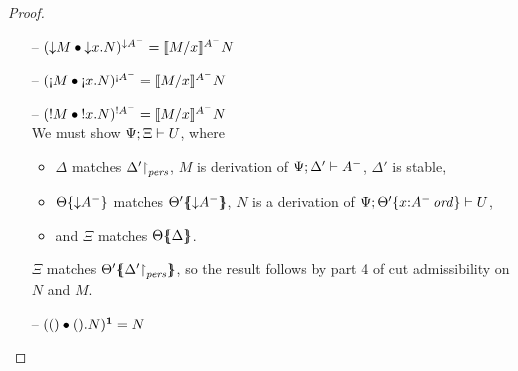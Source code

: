 \begin{proof}
\begin{itemize}
\item[--] $(\subst{\tdownr{M}}{\tdownl{x}{N}})^{{\downarrow}A^-} 
           = \rsubsta{M}{x}{N}{A^-}$ %



\item[--] $(\subst{\tgnabr{M}}{\tgnabl{x}{N}})^{{\scriptgnab}A^-}
           = \rsubsta{M}{x}{N}{A^-}$

\item[--] $(\subst{\tbangr{M}}{\tbangl{x}{N}})^{{!}A^-}
           = \rsubsta{M}{x}{N}{A^-}$ \\
  We must show $\foc{\Psi}{\Xi}{U}$, where
  \begin{itemize}
  \item $\Delta$ matches $\restrictto{\Delta'}{\mpers}$,
        $M$ is derivation of $\foc{\Psi}{\Delta'}{A^-}$, 
        $\Delta'$ is stable,
  \item $\tackon{\Theta}{{\downarrow}A^-}$ matches 
        $\frameoff{\Theta'}{{\downarrow}A^-}$,
        $N$ is a derivation of 
        $\foc{\Psi}{\tackon{\Theta'}{x{:}\istrue{A^-}}}{U}$,
  \item and $\Xi$ matches $\frameoff{\Theta}{\Delta}$.
  \end{itemize}

  $\Xi$ matches $\frameoff{\Theta'}{\restrictto{\Delta'}{\mpers}}$,
  so the result follows by
  part 4 of cut admissibility on $N$ and $M$. 


\item[--] $(\subst{\toner}{\tonel{N}})^{\one} = N$


\end{itemize}
\end{proof}
